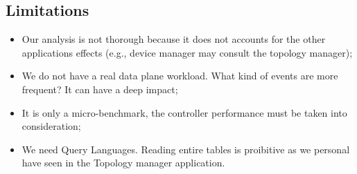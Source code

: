 \subsection{Limitations}
\begin{itemize}
\item Our analysis is not thorough  because it does not accounts for the other applications effects (e.g., device manager may consult the topology manager); 
\item We do not have a real data plane workload. What kind of events are more frequent? It can have a deep impact;
\item It is only a micro-benchmark, the controller performance must be taken into consideration; 
\item We need Query Languages. Reading entire tables is proibitive as we personal have seen in the Topology manager application. 
\end{itemize}


